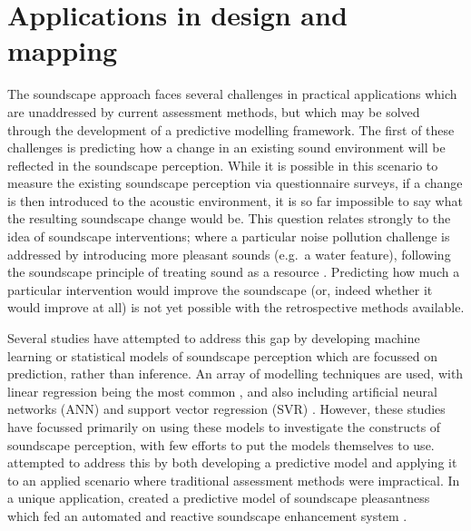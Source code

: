 \documentclass[
  authoryear,
  preprint,
  1p]{elsarticle}
\begin{document}
\section{Applications in design and
mapping}\label{applications-in-design-and-mapping}

The soundscape approach faces several challenges in practical
applications which are unaddressed by current assessment methods, but
which may be solved through the development of a predictive modelling
framework. The first of these challenges is predicting how a change in
an existing sound environment will be reflected in the soundscape
perception. While it is possible in this scenario to measure the
existing soundscape perception via questionnaire surveys, if a change is
then introduced to the acoustic environment, it is so far impossible to
say what the resulting soundscape change would be. This question relates
strongly to the idea of soundscape interventions; where a particular
noise pollution challenge is addressed by introducing more pleasant
sounds (e.g.~a water feature), following the soundscape principle of
treating sound as a resource
\citep{Lavia2016Soundscape, Moshona2022What}. Predicting how much a
particular intervention would improve the soundscape (or, indeed whether
it would improve at all) is not yet possible with the retrospective
methods available.

Several studies have attempted to address this gap by developing machine
learning or statistical models of soundscape perception which are
focussed on prediction, rather than inference. An array of modelling
techniques are used, with linear regression being the most common
\citep{Lionello2020systematic}, and also including artificial neural
networks (ANN) \citep{PuyanaRomero2016Modelling, Yu2009Modeling} and
support vector regression (SVR)
\citep{Fan2016Automatic, Fan2017Emo, Giannakopoulos2019Athens}. However,
these studies have focussed primarily on using these models to
investigate the constructs of soundscape perception, with few efforts to
put the models themselves to use. \citet{Mitchell2021Investigating}
attempted to address this by both developing a predictive model and
applying it to an applied scenario where traditional assessment methods
were impractical. In a unique application, \citet{Ooi2022Probably}
created a predictive model of soundscape pleasantness which fed an
automated and reactive soundscape enhancement system
\citep{Watcharasupat2022Autonomous}.
\end{document}
